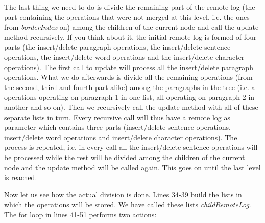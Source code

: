The last thing we need to do is divide the remaining part of the remote log (the part containing
the operations that were not merged at this level, i.e. the ones from \emph{borderIndex} on) among
the children of the current node and call the update method recursively. If you think about it,
the initial remote log is formed of four parts (the insert/delete paragraph operations, the insert/delete
sentence operations, the insert/delete word operations and the insert/delete character operations).
The first call to update will process all the insert/delete paragraph operations. What we do afterwards
is divide all the remaining operations (from the second, third and fourth part alike) among the
paragraphs in the tree (i.e. all operations operating on paragraph 1 in one list, all operating on
paragraph 2 in another and so on). Then we recursively call the update method with all of these
separate lists in turn. Every recursive call will thus have a remote log as parameter which contains
three parts (insert/delete sentence operations, insert/delete word operations and insert/delete character
operations). The process is repeated, i.e. in every call all the insert/delete sentence operations
will be processed while the rest will be divided among the children of the current node and the
update method will be called again. This goes on until the last level is reached.

Now let us see how the actual division is done. Lines 34-39 build the lists in which the operations
will be stored. We have called these lists \emph{childRemoteLog}. The for loop in lines 41-51 performs
two actions:

